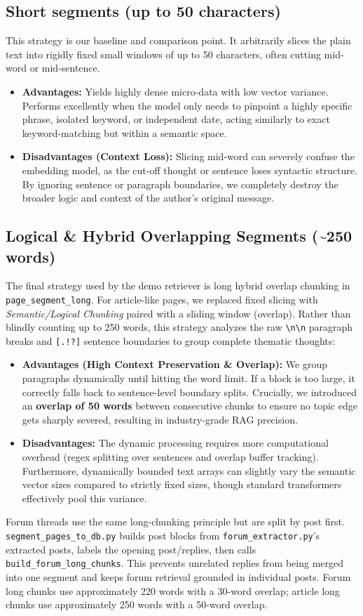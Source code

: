 \documentclass[9pt]{IEEEtran}
\begin{document}
\subsection{Short segments (up to 50 characters)}
This strategy is our baseline and comparison point. It arbitrarily slices the plain text into rigidly fixed small windows of up to 50 characters, often cutting mid-word or mid-sentence.
\begin{itemize}
    \item \textbf{Advantages:} Yields highly dense micro-data with low vector variance. Performs excellently when the model only needs to pinpoint a highly specific phrase, isolated keyword, or independent date,
    acting similarly to exact keyword-matching but within a semantic space.
    \item \textbf{Disadvantages (Context Loss):} Slicing mid-word can severely confuse the embedding model, as the cut-off thought or sentence loses syntactic structure.
    By ignoring sentence or paragraph boundaries, we completely destroy the broader logic and context of the author's original message.
\end{itemize}

\subsection{Logical \& Hybrid Overlapping Segments (\textasciitilde{}250 words)}
The final strategy used by the demo retriever is long hybrid overlap chunking in \texttt{page\_segment\_long}. For article-like pages, we replaced fixed slicing with \textit{Semantic/Logical Chunking} paired with a sliding window (overlap).
Rather than blindly counting up to 250 words, this strategy analyzes the raw \verb|\n\n| paragraph breaks and \verb|[.!?]| sentence boundaries to group complete thematic thoughts:
\begin{itemize}
    \item \textbf{Advantages (High Context Preservation \& Overlap):} We group paragraphs dynamically until hitting the word limit. If a block is too large, it correctly falls back to sentence-level boundary splits.
    Crucially, we introduced an \textbf{overlap of 50 words} between consecutive chunks to ensure no topic edge gets sharply severed, resulting in industry-grade RAG precision.
    \item \textbf{Disadvantages:} The dynamic processing requires more computational overhead (regex splitting over sentences and overlap buffer tracking). Furthermore, dynamically bounded text arrays can slightly vary the semantic
    vector sizes compared to strictly fixed sizes, though standard transformers effectively pool this variance.
\end{itemize}
Forum threads use the same long-chunking principle but are split by post first. \texttt{segment\_pages\_to\_db.py} builds post blocks from \texttt{forum\_extractor.py}'s extracted posts,
labels the opening post/replies, then calls \texttt{build\_forum\_long\_chunks}. This prevents unrelated replies from being merged into one segment and keeps forum retrieval grounded in individual posts.
Forum long chunks use approximately 220 words with a 30-word overlap; article long chunks use approximately 250 words with a 50-word overlap.
\end{document}
